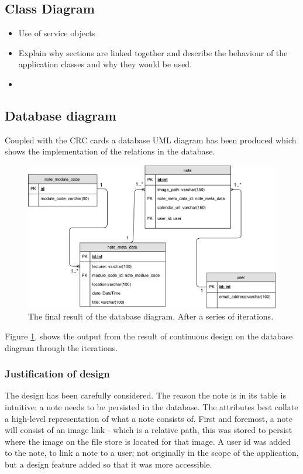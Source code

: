 \subsection{Class Diagram}

\begin{itemize}
  \item Use of service objects
  \item Explain why sections are linked together and describe the behaviour of the application classes and why they would be used.
  \item
\end{itemize}

\subsection{Database diagram}
Coupled with the CRC cards a database UML diagram has been produced which shows the implementation of the relations in the database.

\begin{figure}[h]
  \centering
  \includegraphics[scale=0.5]{images/database_diagram}
  \caption{The final result of the database diagram. After a series of iterations.}
  \label{fig:database}
\end{figure}

Figure \ref{fig:database}, shows the output from the result of continuous design on the database diagram through the iterations.

\subsubsection{Justification of design}
The design has been carefully considered. The reason the note is in its table is intuitive: a note needs to be persisted in the database. The attributes best collate a high-level representation of what a note consists of. First and foremost,  a note will consist of an image link - which is a relative path, this was stored to persist where the image on the file store is located for that image. A user id was added to the note, to link a note to a user; not originally in the scope of the application, but a design feature added so that it was more accessible.

